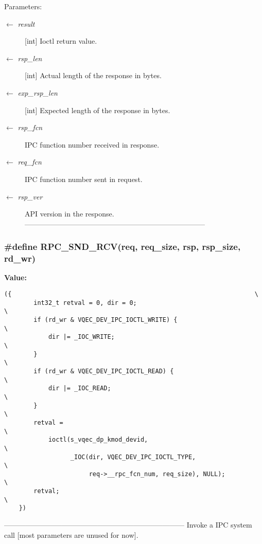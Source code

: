 \begin{Desc}
\item[Parameters:]
\begin{description}
\item[\mbox{$\leftarrow$} {\em result}][int] Ioctl return value. \item[\mbox{$\leftarrow$} {\em rsp\_\-len}][int] Actual length of the response in bytes. \item[\mbox{$\leftarrow$} {\em exp\_\-rsp\_\-len}][int] Expected length of the response in bytes. \item[\mbox{$\leftarrow$} {\em rsp\_\-fcn}]IPC function number received in response. \item[\mbox{$\leftarrow$} {\em req\_\-fcn}]IPC function number sent in request. \item[\mbox{$\leftarrow$} {\em rsp\_\-ver}]API version in the response. --------------------------------------------------------------------------- \end{description}
\end{Desc}
\subsubsection{\setlength{\rightskip}{0pt plus 5cm}\#define RPC\_\-SND\_\-RCV(req, req\_\-size, rsp, rsp\_\-size, rd\_\-wr)}\label{vqec__rpc__client_8c_15e9f49f017b88b20165bd8b4cb4bd1d}


\textbf{Value:}

\begin{Code}\begin{verbatim}({                                                                  \
        int32_t retval = 0, dir = 0;                                    \
        if (rd_wr & VQEC_DEV_IPC_IOCTL_WRITE) {                         \
            dir |= _IOC_WRITE;                                          \
        }                                                               \
        if (rd_wr & VQEC_DEV_IPC_IOCTL_READ) {                          \
            dir |= _IOC_READ;                                           \
        }                                                               \
        retval =                                                        \
            ioctl(s_vqec_dp_kmod_devid,                                 \
                  _IOC(dir, VQEC_DEV_IPC_IOCTL_TYPE,                    \
                       req->__rpc_fcn_num, req_size), NULL);            \
        retval;                                                         \
    })
\end{verbatim}\end{Code}
--------------------------------------------------------------------------- Invoke a IPC system call [most parameters are unused for now].

